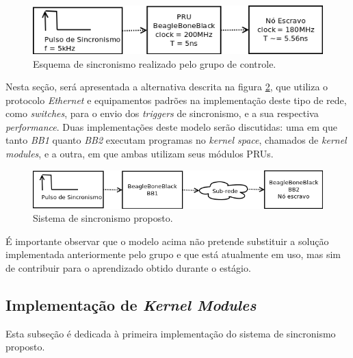 \begin{figure}[h]

\centering
\includegraphics[scale=0.65]{image/pru_bbb_sincronismo}
\caption {Esquema de sincronismo realizado pelo grupo de controle.}
\label{fig:pru_sincronismo}
\end{figure}

\vspace{12pt}

Nesta seção, será apresentada a alternativa descrita na figura
\ref{fig:pru_sincronismo_ethernet}, que utiliza o protocolo \textit{Ethernet} e
equipamentos padrões na implementação deste tipo de rede, como
\textit{switches}, para o envio dos \textit{triggers} de sincronismo, e a sua
respectiva \textit{performance}. Duas implementações deste modelo serão
discutidas: uma em que tanto \textit{BB1} quanto \textit{BB2} executam
programas no \textit{kernel space}, chamados de \textit{kernel modules}, e a
outra, em que ambas utilizam seus módulos PRUs.

\vspace{12pt}

\begin{figure}[h]

\centering
\includegraphics[scale=0.65]{image/pru_bbb_sincronismo_ethernet}
\caption {Sistema de sincronismo proposto.}
\label{fig:pru_sincronismo_ethernet}
\end{figure}

É importante observar que o modelo acima não pretende substituir a solução
implementada anteriormente pelo grupo \cite{pat} e que está atualmente em uso,
mas sim de contribuir para o aprendizado obtido durante o estágio.

\subsection {Implementação de \textit{Kernel Modules}}

Esta subseção é dedicada à primeira implementação do sistema de sincronismo
proposto.


